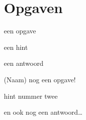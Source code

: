 \documentclass[12pt]{article}
\begin{document}
\section{Opgaven}

\begin{opgave}[5]
een opgave
\begin{hint}
een hint
\end{hint}
\begin{antwoord}
een antwoord
\end{antwoord}
\end{opgave}

\begin{opgave}[\schaar,3](Naam)
nog een opgave!
\begin{hint}
hint nummer twee
\end{hint}
\begin{antwoord}
en ook nog een antwoord\ldots
\end{antwoord}
\end{opgave}

\hintsantwoorden
\end{document}
